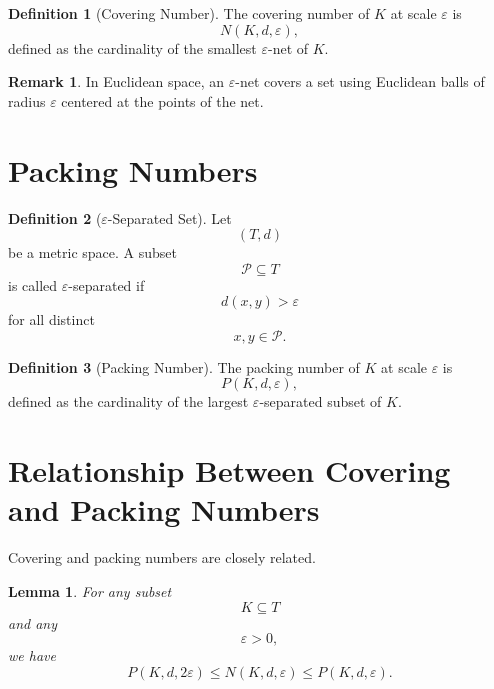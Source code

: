 \documentclass[12pt,oneside]{book}
\numberwithin{equation}{section}
\theoremstyle{definition}
\newtheorem{definition}{Definition}[section]
\newtheorem{remark}{Remark}[section]
\theoremstyle{plain}
\newtheorem{lemma}{Lemma}[section]
\theoremstyle{remark}
\begin{document}
\begin{definition}[Covering Number]
The covering number of $K$ at scale $\varepsilon$ is
\[
N(K,d,\varepsilon),
\]
defined as the cardinality of the smallest $\varepsilon$-net of $K$.
\end{definition}

\begin{remark}
In Euclidean space, an $\varepsilon$-net covers a set using Euclidean balls of radius $\varepsilon$ centered at the points of the net.
\end{remark}

\section{Packing Numbers}

\begin{definition}[$\varepsilon$-Separated Set]
Let
\[
(T,d)
\]
be a metric space. A subset
\[
\mathcal{P}\subseteq T
\]
is called $\varepsilon$-separated if
\[
d(x,y)>\varepsilon
\]
for all distinct
\[
x,y\in\mathcal{P}.
\]
\end{definition}

\begin{definition}[Packing Number]
The packing number of $K$ at scale $\varepsilon$ is
\[
P(K,d,\varepsilon),
\]
defined as the cardinality of the largest $\varepsilon$-separated subset of $K$.
\end{definition}

\section{Relationship Between Covering and Packing Numbers}

Covering and packing numbers are closely related.

\begin{lemma}
For any subset
\[
K\subseteq T
\]
and any
\[
\varepsilon>0,
\]
we have
\[
P(K,d,2\varepsilon)
\leq
N(K,d,\varepsilon)
\leq
P(K,d,\varepsilon).
\]
\end{lemma}
\end{document}

